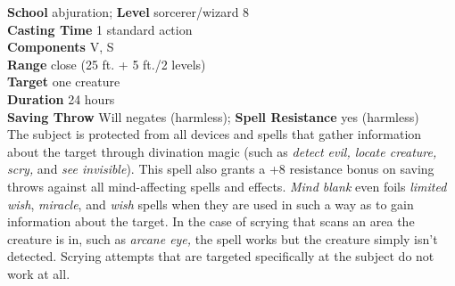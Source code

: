 \textbf{School }abjuration; \textbf{Level }sorcerer/wizard 8\\
\textbf{Casting Time }1 standard action\\
\textbf{Components }V, S\\
\textbf{Range }close (25 ft. + 5 ft./2 levels)\\
\textbf{Target }one creature\\
\textbf{Duration }24 hours\\
\textbf{Saving Throw} Will negates (harmless); \textbf{Spell Resistance} yes (harmless)\\
The subject is protected from all devices and spells that gather information about the target through divination magic (such as \textit{detect evil, locate creature, scry, }and\textit{ see invisible}). This spell also grants a +8 resistance bonus on saving throws against all mind-affecting spells and effects. \textit{Mind blank }even foils \textit{limited wish}, \textit{miracle}, and \textit{wish }spells when they are used in such a way as to gain information about the target. In the case of scrying that scans an area the creature is in, such as \textit{arcane eye, }the spell works but the creature simply isn't detected. Scrying attempts that are targeted specifically at the subject do not work at all.\\
